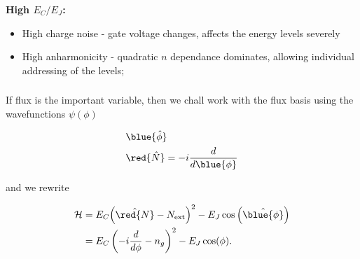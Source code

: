 \begin{framed}\noindent
  \textbf{High $ E_C/E_J $:}
  \begin{itemize}
  \item High charge noise -  gate voltage changes, affects the energy
    levels severely
  \item High  anharmonicity - quadratic  $ n $  dependance dominates,
    allowing individual addressing of the levels;
  \end{itemize}

\end{framed}

\newpage\subsubsection{}
If flux is  the important variable, then we chall  work with the flux
basis using the wavefunctions $ \psi(\phi) $

\begin{framed}\noindent

  \begin{equation}
    \begin{aligned}
      &\blue{\hat{\phi}} \qquad\\
      &\red{\hat{N}} = -i\frac{d}{d\blue{\phi}}
    \end{aligned}
  \end{equation}

\end{framed}
\noindent and we rewrite

\begin{equation}
  \begin{aligned}
    \mathcal{H} & = E_C{\left(\hat{\red{N}}-N_\text{ext}\right)^2}- E_J\cos\left(\hat{\blue{\phi}}\right)\\
    & = E_C\left(-i\frac{d}{d\phi} - n_g\right)^2 - E_J\cos(\phi).
  \end{aligned}
\end{equation}


